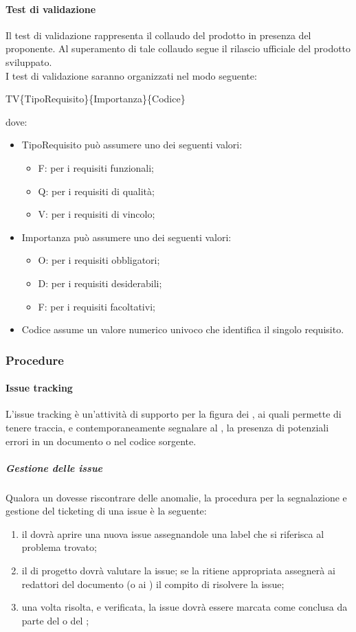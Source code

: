 \paragraph{Test di validazione}
Il test di validazione rappresenta il collaudo del prodotto in presenza del proponente. Al
superamento di tale collaudo segue il rilascio ufficiale del prodotto sviluppato.\\
I test di validazione saranno organizzati nel modo seguente: \\
\begin{center} TV\{TipoRequisito\}\{Importanza\}\{Codice\} \end{center}
dove:
\begin{itemize}
	\item TipoRequisito può assumere uno dei seguenti valori:
	\begin{itemize}
		\item F: per i requisiti funzionali;
		\item Q: per i requisiti di qualità;
		\item V: per i requisiti di vincolo;
	\end{itemize}
	\item Importanza può assumere uno dei seguenti valori:
	\begin{itemize}
		\item O: per i requisiti obbligatori;
		\item D: per i requisiti desiderabili;
		\item F: per i requisiti facoltativi;
	\end{itemize}
	\item Codice assume un valore numerico univoco che identifica il singolo requisito.
\end{itemize}

\subsubsection{Procedure}
\paragraph{Issue tracking}
L'issue tracking è un'attività di supporto per la figura dei \VERP, ai quali permette di tenere traccia, e contemporaneamente segnalare al \RESP, la presenza di potenziali errori in un documento o nel codice sorgente.
 \subparagraph{Gestione delle issue}
Qualora un \VER{} dovesse riscontrare delle anomalie, la procedura per la segnalazione e gestione del ticketing di una issue è la seguente:
\begin{enumerate}
	\item il \VER{} dovrà aprire una nuova issue assegnandole una label che si riferisca al problema trovato;
	\item il \RESP{} di progetto dovrà valutare la issue; se la ritiene appropriata assegnerà ai redattori del documento (o ai \PRP) il compito di risolvere la issue;
	\item una volta risolta, e verificata, la issue dovrà essere marcata come conclusa da parte del \RESP{} o del \VER;
\end{enumerate}
